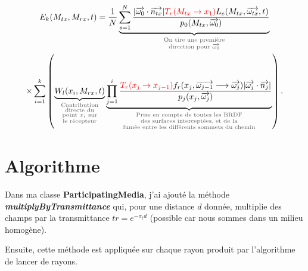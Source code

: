 \large \begin{multline}
    E_k(M_{tx}, M_{rx}, t) =
    \frac{1}{N}
    \underbrace{
        \sum\limits_{s=1}^N \frac
            {| \overrightarrow{\omega_0} \cdot \overrightarrow{n_{tx}} |
             \textcolor{red}{T_r(M_{tx} \rightarrow x_1)}
             L_e(M_{tx}, \overrightarrow{\omega_{tx}}, t)}
            {p_0(M_{tx}, \overrightarrow{\omega_0})}
        }
        _{\textcolor{DarkGray}
         {\substack{\text{On tire une première} \\
                    \text{direction pour $\overrightarrow{\omega_0}$}}}}
    \\ \times
    \sum \limits_{i=1}^k
    \left(
        \underbrace
            {W_l(x_i, M_{rx}, t)}
            _{\textcolor{DarkGray}
             {\substack{\text{Contribution} \\
                        \text{directe du} \\
                        \text{point $x_i$ sur} \\
                        \text{le récepteur}}}}
        \underbrace
            {\prod\limits_{j=1}^i
                \frac{
                    \textcolor{red}{T_r(x_j \rightarrow x_{j-1})}
                    f_r(x_j, \overrightarrow{\omega_{j-1}} \longrightarrow \overrightarrow{\omega_{j}})
                    | \overrightarrow{\omega_j} \cdot \overrightarrow{n_j} |}
                    {p_j(x_j, \overrightarrow{\omega_{j}})}}
                _{\textcolor{DarkGray}
                 {\substack{\text{Prise en compte de toutes les BRDF} \\
                            \text{des surfaces interceptées, et de la} \\
                            \text{fumée entre les différents sommets du chemin}}}}
    \right)
.\end{multline} \normalsize



\section{Algorithme}

Dans ma classe \textbf{ParticipatingMedia}, j'ai ajouté la méthode \textbf{\textit{multiplyByTransmittance}} qui, pour une distance $d$ donnée, multiplie des champs par la transmittance $tr = e^{-\sigma_t d}$ (possible car nous sommes dans un milieu homogène).\par
Ensuite, cette méthode est appliquée sur chaque rayon produit par l'algorithme de lancer de rayons.

